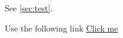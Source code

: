 \documentclass{article}
\begin{document}


\clearpage

See \ref{sec:test}.

Use the following link \hyperlink{testlink}{Click me}
\end{document}
